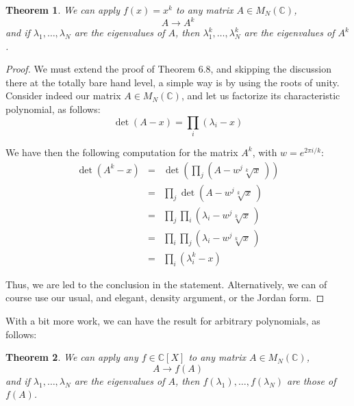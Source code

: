 \documentclass[12pt]{amsbook}
\newtheorem{theorem}{Theorem}[chapter]
\begin{document}
\begin{theorem}
We can apply $f(x)=x^k$ to any matrix $A\in M_N(\mathbb C)$, 
$$A\to A^k$$
and if $\lambda_1,\ldots,\lambda_N$ are the eigenvalues of $A$, then $\lambda_1^k,\ldots,\lambda_N^k$ are the eigenvalues of $A^k$.
\end{theorem}

\begin{proof}
We must extend the proof of Theorem 6.8, and skipping the discussion there at the totally bare hand level, a simple way is by using the roots of unity. Consider indeed our matrix $A\in M_N(\mathbb C)$, and let us factorize its characteristic polynomial, as follows:
$$\det(A-x)=\prod_i(\lambda_i-x)$$

We have then the following computation for the matrix $A^k$, with $w=e^{2\pi i/k}$:
\begin{eqnarray*}
\det(A^k-x)
&=&\det\left(\prod_j\left(A-w^j\sqrt[k]{x}\,\right)\right)\\
&=&\prod_j\det\left(A-w^j\sqrt[k]{x}\,\right)\\
&=&\prod_j\prod_i\left(\lambda_i-w^j\sqrt[k]{x}\,\right)\\
&=&\prod_i\prod_j\left(\lambda_i-w^j\sqrt[k]{x}\,\right)\\
&=&\prod_i(\lambda_i^k-x)
\end{eqnarray*}

Thus, we are led to the conclusion in the statement. Alternatively, we can of course use our usual, and elegant, density argument, or the Jordan form.
\end{proof}

With a bit more work, we can have the result for arbitrary polynomials, as follows:

\begin{theorem}
We can apply any $f\in\mathbb C[X]$ to any matrix $A\in M_N(\mathbb C)$, 
$$A\to f(A)$$
and if $\lambda_1,\ldots,\lambda_N$ are the eigenvalues of $A$, then $f(\lambda_1),\ldots,f(\lambda_N)$ are those of $f(A)$.
\end{theorem}
\end{document}
